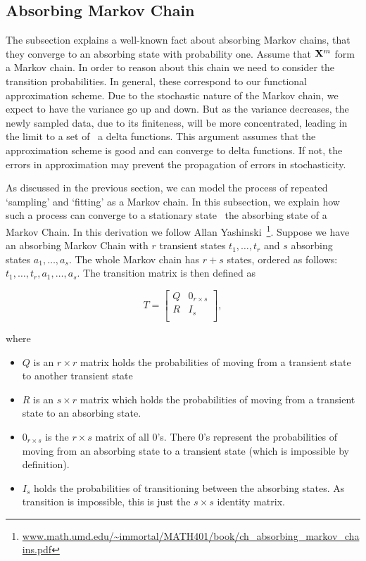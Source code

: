 
\subsection{Absorbing Markov Chain}
\label{ap:markov}
The subsection explains a well-known fact about absorbing Markov chains, that they converge to an absorbing state with probability one. 
Assume that $\mathbf{X}^m$ form a Markov chain.
In order to reason about this chain we need to consider the transition probabilities. In general, these correspond to our functional approximation scheme. 
Due to the stochastic nature of the Markov chain, we expect to have the variance go up and down. But as the variance decreases, the newly sampled data, due to its finiteness, will be more concentrated, leading in the limit to a set of \ie~a delta functions. This argument assumes that the approximation scheme is good and can converge to delta functions. If not, the errors in approximation may prevent the propagation of errors in stochasticity.



As discussed in the previous section, we can model the process of repeated `sampling' and `fitting' as a Markov chain. In this subsection, we explain how such a process can converge to a stationary state \ie~the absorbing state of a Markov Chain. 
In this derivation we follow Allan Yashinski~\footnote{\url{www.math.umd.edu/~immortal/MATH401/book/ch_absorbing_markov_chains.pdf}}. Suppose we have an absorbing Markov Chain with $r$ transient states $t_1, \dots, t_r$ and $s$ absorbing states $a_1, \dots, a_s$. The whole Markov chain has $r+s$ states, ordered as follows: $t_1, \dots, t_r, a_1, \dots, a_s$. The transition matrix is then defined as 

\begin{equation}
    T = \begin{bmatrix}
            Q & 0_{r\times s}\\
            R & I_s \\
    \end{bmatrix},
\end{equation} 

where
\begin{itemize}
    \item $Q$ is an $r\times r$ matrix holds the probabilities of moving from a transient state to another transient state
    \item $R$ is an $s\times r$ matrix which holds the probabilities of moving from a transient state to an absorbing state. 
    \item $0_{r\times s}$ is the $r\times s$ matrix of all 0's. There 0's represent the probabilities of moving from an absorbing state to a transient state (which is impossible by definition).
    \item $I_s$ holds the probabilities of transitioning between the absorbing states. As transition is impossible, this is just the $s\times s$ identity matrix.
\end{itemize}

